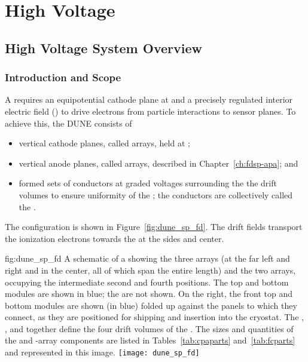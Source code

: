 \chapter{High Voltage}
\label{ch:sp-hv}
\section{High Voltage System Overview}
\label{sec:fdsp-hv-ov}

\subsection{Introduction and Scope}
\label{sec:fdsp-hv-intro}

A  requires an equipotential cathode plane at  and a precisely regulated interior electric field (\efield{}) to drive 
electrons from particle interactions to sensor planes.  To achieve this, the DUNE   consists of 
\begin{itemize}
\item vertical cathode planes, called  arrays, held at ;
\item vertical anode planes, called  arrays, described in Chapter~\ref{ch:fdsp-apa}; and
\item formed sets of conductors at graded voltages surrounding the
 the drift volumes to ensure uniformity of the \efield; the conductors are collectively called the .
\end{itemize}

The \single {} configuration is shown in Figure~\ref{fig:dune_sp_fd}.
The  drift fields transport the ionization electrons 
towards the  at the sides and center.

\begin{dunefigure}
{fig:dune_sp_fd}
{A schematic of a  showing the three  arrays (at the far left and right and in the center, all of which span the entire \sptpclen {} length) and the two  arrays, occupying the intermediate second and fourth positions. The top and bottom  modules are shown in blue; the  are not shown. 
On the right, the front top and bottom  modules are shown (in blue) folded up against the  panels to which they connect, as they are positioned for shipping and insertion into the cryostat.  The , , and  together define the four drift volumes of the . The sizes and quantities of the  and -array components are listed in Tables~\ref{tab:cpaparts} and~\ref{tab:fcparts} and represented in this image.}
\texttt{[image: dune\_sp\_fd]}
\end{dunefigure}

